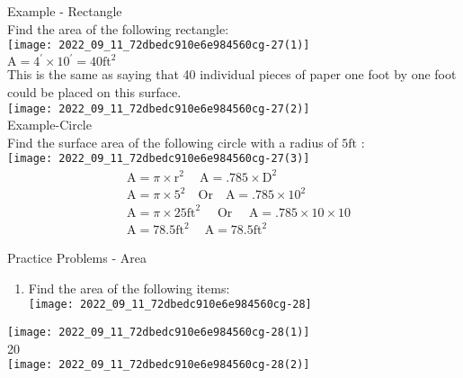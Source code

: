 Example - Rectangle\\

Find the area of the following rectangle:\\

\texttt{[image: 2022\_09\_11\_72dbedc910e6e984560cg-27(1)]}\\

$\mathrm{A}=4^{\prime} \times 10^{\prime}=40 \mathrm{ft}^{2}$\\

This is the same as saying that 40 individual pieces of paper one foot by one foot could be placed on this surface.\\

\texttt{[image: 2022\_09\_11\_72dbedc910e6e984560cg-27(2)]}\\

Example-Circle\\

Find the surface area of the following circle with a radius of $5 \mathrm{ft}$ :\\

\texttt{[image: 2022\_09\_11\_72dbedc910e6e984560cg-27(3)]}
$$
\begin{aligned}
& \mathrm{A}=\pi \times \mathrm{r}^{2} \quad \mathrm{~A}=.785 \times \mathrm{D}^{2} \\
& \mathrm{A}=\pi \times 5^{2} \quad \mathrm{Or} \quad \mathrm{A}=.785 \times 10^{2} \\
& \mathrm{A}=\pi \times 25 \mathrm{ft}^{2} \quad \text { Or } \quad \mathrm{A}=.785 \times 10 \times 10 \\
& \mathrm{A}=78.5 \mathrm{ft}^{2} \quad \mathrm{~A}=78.5 \mathrm{ft}^{2} 
\end{aligned}
$$

Practice Problems - Area\\
\begin{enumerate}
  \item Find the area of the following items:\\

\texttt{[image: 2022\_09\_11\_72dbedc910e6e984560cg-28]}
\end{enumerate}
\texttt{[image: 2022\_09\_11\_72dbedc910e6e984560cg-28(1)]}\\

20\\

\texttt{[image: 2022\_09\_11\_72dbedc910e6e984560cg-28(2)]}\\

